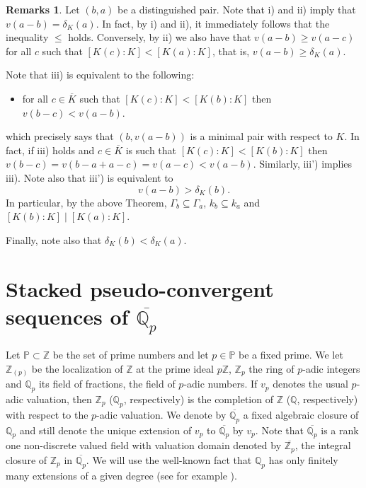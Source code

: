 \documentclass[10pt]{article}
\numberwithin{equation}{section}
\theoremstyle{definition}\newtheorem{Def}[equation]{Definition}
\newtheorem{Rems}[equation]{Remarks}
\theoremstyle{definition}\newtheorem{Ques}[equation]{Question}
\newcommand{\Q}{\mathbb{Q}}
\newcommand{\Z}{\mathbb{Z}}
\newcommand{\PP}{\mathbb{P}}
\newcommand{\oQp}{\overline{\Q_p}}
\newcommand{\oZp}{\overline{\Z_p}}
\begin{document}
\begin{Rems}\label{properties distinguised pair}
Let $(b,a)$ be a distinguished pair. Note that i) and ii) imply that $v(a-b)=\delta_K(a)$. In fact, by i) and ii), it immediately follows that the inequality $\leq$ holds. Conversely, by ii) we also have that $v(a-b)\geq v(a-c)$ for all $c$ such that $[K(c):K]<[K(a):K]$, that is, $v(a-b)\geq \delta_K(a)$.

Note that iii) is equivalent to the following:
\begin{itemize}
\item[iii')] for all $c\in\overline{K}$ such that $[K(c):K]<[K(b):K]$ then $v(b-c)<v(a-b)$. 
\end{itemize}
which precisely says that $(b,v(a-b))$ is a minimal pair with respect to $K$. In fact, if iii) holds and $c\in\overline{K}$ is such that $[K(c):K]<[K(b):K]$ then $v(b-c)=v(b-a+a-c)=v(a-c)<v(a-b)$. Similarly, iii') implies iii). Note also that iii') is equivalent to 
$$v(a-b)>\delta_K(b).$$
In particular, by the above Theorem, $\Gamma_{b}\subseteq\Gamma_{a}$, $k_{b}\subseteq k_{a}$ and $[K(b):K]\mid [K(a):K]$. 

Finally, note also that  $\delta_K(b)<\delta_K(a)$.
\end{Rems} 

\section{Stacked pseudo-convergent sequences of  $\oQp$}\label{stacked sect}

Let $\PP\subset\Z$ be the set of prime numbers and let $p\in\PP$ be a fixed prime. We let $\Z_{(p)}$ be the localization of $\Z$ at the prime ideal $p\Z$, $\Z_p$ the ring of $p$-adic integers and $\Q_p$ its field of fractions, the field of $p$-adic numbers. If $v_p$ denotes the usual $p$-adic valuation, then $\Z_p$ ($\Q_p$, respectively) is the completion of $\Z$ ($\Q$, respectively) with respect to the $p$-adic valuation. We denote by $\oQp$ a fixed algebraic closure of $\Q_p$ and still denote the unique extension of $v_p$ to $\oQp$ by $v_p$. Note that $\oQp$ is a rank one non-discrete valued field with valuation domain denoted by $\oZp$, the integral closure of $\Z_p$ in $\oQp$. We will use the well-known fact that $\Q_p$ has only finitely many extensions of a given degree  (see for example \cite[Corollary 2, Chapter V, p. 202]{Nark}).
\end{document}
